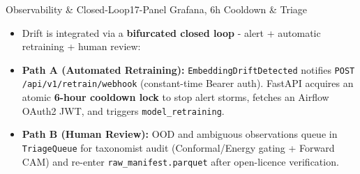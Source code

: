 \documentclass[aspectratio=169,10pt]{beamer}
\begin{document}
\begin{frame}{Observability \& Closed-Loop}{17-Panel Grafana, 6h Cooldown \& Triage}
{\begin{itemize}
            \item Drift is integrated via a \textbf{bifurcated closed loop} - alert + automatic retraining + human review:
            \item \textbf{Path A (Automated Retraining):} \texttt{EmbeddingDriftDetected} notifies \texttt{POST /api/v1/retrain/webhook} (constant-time Bearer auth). FastAPI acquires an atomic \textbf{6-hour cooldown lock} to stop alert storms, fetches an Airflow OAuth2 JWT, and triggers \texttt{model\_retraining}.
            \item \textbf{Path B (Human Review):} OOD and ambiguous observations queue in \texttt{TriageQueue} for taxonomist audit (Conformal/Energy gating + Forward CAM) and re-enter \texttt{raw\_manifest.parquet} after open-licence verification.
        \end{itemize}
    }
\end{frame}
\end{document}
